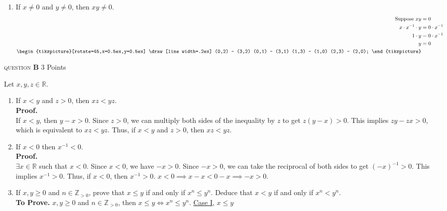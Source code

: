 \documentclass[11pt]{article}
\newcommand{\problem
}[2]{
\begin{mdframed}
    \textsc{question} \textbf{#1} \hfill #2
\end{mdframed}
}
\newcommand{\contradiction}{%
\begin{tikzpicture}[rotate=45,x=0.5ex,y=0.5ex]
\draw[line width=.2ex] (0,2) -- (3,2) (0,1) -- (3,1) (1,3) -- (1,0) (2,3) -- (2,0);
\end{tikzpicture}
}
\begin{document}
\begin{enumerate}
	\item If $x \neq 0$ and $y \neq 0$, then $x y \neq 0$.
	      \begin{align*}
		      \text{Suppose } x y    & = 0             \\
		      x \cdot x^{-1} \cdot y & = 0\cdot x^{-1} \\
		      1 \cdot y              & = 0\cdot x^{-1} \\
		      y                      & = 0
		      \\
		      \contradiction
	      \end{align*}


\end{enumerate}

\newpage
\problem{B}{3 Points}
Let $x, y, z \in \mathbb{R}$.
\begin{enumerate}
	\item If $x<y$ and $z>0$, then $x z<y z$.
	      \\
	      \textbf{Proof.}\\
	      If $x < y$, then $y - x > 0$. Since $z > 0$, we can multiply both sides of the inequality by $z$ to get $z(y - x) > 0$. This implies $z y - z x > 0$, which is equivalent to $x z < y z$. Thus, if $x < y$ and $z > 0$, then $x z < y z$.


	\item If $x<0$ then $x^{-1}<0$.
	      \\
	      \textbf{Proof.}\\
	      $\exists  x \in \mathbb{R}$ such that $x < 0$. Since $x < 0$, we have $-x > 0$. Since $-x > 0$, we can take the reciprocal of both sides to get $(-x)^{-1} > 0$. This implies $x^{-1} > 0$. Thus, if $x < 0$, then $x^{-1} > 0$.
	      $x < 0 \implies x-x < 0-x \implies -x > 0$.
	\item If $x, y \geq 0$ and $n \in \mathbb{Z}_{>0}$, prove that $x \leq y$ if and only if $x^n \leq y^n$. Deduce that $x<y$ if and only if $x^n<y^n$.
	      \\
	      \textbf{To Prove.} $x, y \geq 0$ and $n \in \mathbb{Z}_{>0}$, then $x \leq y \iff x^n \leq y^n$.
	      \underline{Case I}, $x \leq y$\\


\end{enumerate}
\end{document}
